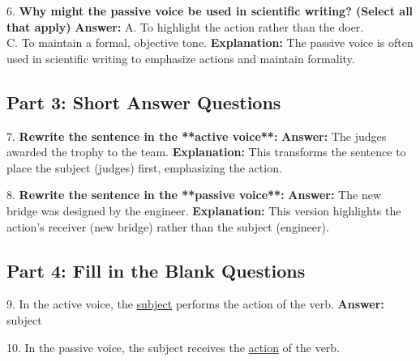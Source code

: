 \documentclass[12pt]{article}
\begin{document}
\vspace{1cm}
6. \textbf{Why might the passive voice be used in scientific writing? (Select all that apply)}  
\textbf{Answer:} A. To highlight the action rather than the doer. \\
C. To maintain a formal, objective tone.  
\textbf{Explanation:} The passive voice is often used in scientific writing to emphasize actions and maintain formality.

\subsection*{Part 3: Short Answer Questions}

7. \textbf{Rewrite the sentence in the **active voice**:}  
\textbf{Answer:} The judges awarded the trophy to the team.  
\textbf{Explanation:} This transforms the sentence to place the subject (judges) first, emphasizing the action.

\vspace{1cm}
8. \textbf{Rewrite the sentence in the **passive voice**:}  
\textbf{Answer:} The new bridge was designed by the engineer.  
\textbf{Explanation:} This version highlights the action's receiver (new bridge) rather than the subject (engineer).

\subsection*{Part 4: Fill in the Blank Questions}

9. In the active voice, the \underline{subject} performs the action of the verb.  
\textbf{Answer:} subject

10. In the passive voice, the subject receives the \underline{action} of the verb.  
\end{document}
